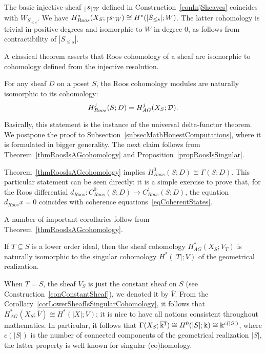 \begin{ex}\label{exInjectiveIsCone}
The basic injective sheaf ${_{\lceil}s_{\rceil W}}$ defined in Construction~\ref{conInjSheaves} coincides with $W_{S_{\leq s}}$. We have $H^*_{Roos}(X_S;{_{\lceil}s_{\rceil W}})\cong H^*(|S_{\leq s}|;W)$. The latter cohomology is trivial in positive degrees and isomorphic to $W$ in degree $0$, as follows from contractibility of $|S_{\leq s}|$.
\end{ex}

A classical theorem asserts that Roos cohomology of a sheaf are isomorphic to cohomology defined from the injective resolution.

\begin{thm}\label{thmRoosIsAGcohomology}
For any sheaf $D$ on a poset $S$, the Roos cohomology modules are naturally isomorphic to its cohomology:
\[
H^j_{Roos}(S;D)=H^j_{AG}(X_S;\mathcal{D}).
\]
\end{thm}

Basically, this statement is the instance of the universal delta-functor theorem. We postpone the proof to Subsection~\ref{subsecMathHonestComputations}, where it is formulated in bigger generality. The next claim follows from Theorem~\ref{thmRoosIsAGcohomology} and Proposition~\ref{propRoosIsSingular}.

\begin{rem}\label{remRoos0globalSec}
Theorem~\ref{thmRoosIsAGcohomology} implies $H^0_{Roos}(S;D)\cong \Gamma(S;D)$. This particular statement can be seen directly: it is a simple exercise to prove that, for the Roos differential $d_{Roos}\colon C^0_{Roos}(S;D)\to C^1_{Roos}(S;D)$, the equation $d_{Roos}x=0$ coincides with coherence equations~\ref{eqCoherentStates}.
\end{rem}

A number of important corollaries follow from Theorem~\ref{thmRoosIsAGcohomology}.

\begin{cor}\label{corLowerSheafIsSingularCohomology}
If $T\subseteq S$ is a lower order ideal, then the sheaf cohomology $H^*_{AG}(X_S;V_T)$ is naturally isomorphic to the singular cohomology $H^*(|T|;V)$ of the geometrical realization.
\end{cor}

\begin{ex}\label{exConstantSheaf}
When $T=S$, the sheaf $V_S$ is just the constant sheaf on $S$ (see Construction~\ref{conConstantSheaf}), we denoted it by $\bar{V}$. From the Corollary~\ref{corLowerSheafIsSingularCohomology}, it follows that $H^*_{AG}(X_S;\bar{V})\cong H^*(|X|;V)$; it is nice to have all notions consistent throughout mathematics. In particular, it follows that $\Gamma(X_S;\overline{\Bbbk^1})\cong H^0(|S|;\Bbbk)\cong \Bbbk^{c(|S|)}$, where $c(|S|)$ is the number of connected components of the geometrical realization $|S|$, the latter property is well known for singular (co)homology.
\end{ex}

